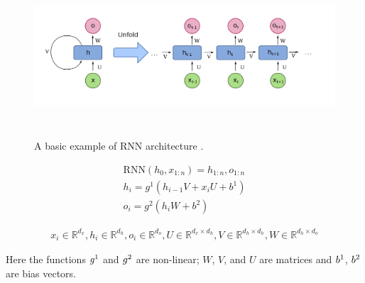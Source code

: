 \documentclass[a4paper, 11pt]{article}
\newcommand{\R}{\mathbb{R}}
\begin{document}

\begin{figure}[htpb!]
    \centering
    \includegraphics[width=\textwidth,height=6cm,keepaspectratio=true]
    {Recurrent_neural_network_unfold.png}
    \caption{
        A basic example of RNN architecture \cite{WikipediaEN_RNN_unfold}.
    }
    \label{fig:A basic RNN architecture}
\end{figure}

\begin{align*}
\mathrm{RNN}(h_0,x_{1:n}) = h_{1:n}, o_{1:n} \\
h_i = g^1(h_{i-1}V + x_iU + b^1) \\
o_i = g^2(h_iW + b^2) 
\end{align*}

\begin{align*}
x_i \in \R^{d_x}, h_i \in \R^{d_h}, o_i \in \R^{d_o}, U \in \R^{d_x \times d_h}, V \in \R^{d_h \times d_h}, W \in \R^{d_h \times d_o}
\end{align*}

Here the functions $g\textsuperscript{1}$ and $g\textsuperscript{2}$ are non-linear; $W$, $V$, and $U$ are matrices and $b\textsuperscript{1}$, $b\textsuperscript{2}$ are bias vectors. 
\end{document}
